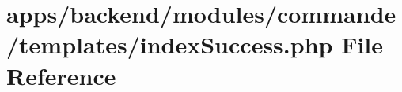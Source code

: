 \hypertarget{backend_2modules_2commande_2templates_2index_success_8php}{\section{apps/backend/modules/commande/templates/index\-Success.php File Reference}
\label{backend_2modules_2commande_2templates_2index_success_8php}
}
